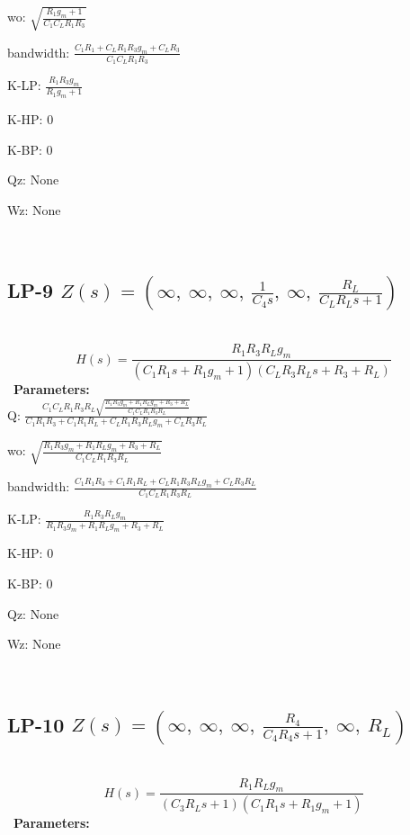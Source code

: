 \documentclass{article}
\begin{document}
wo: $\sqrt{\frac{R_{1} g_{m} + 1}{C_{1} C_{L} R_{1} R_{3}}}$\ 

bandwidth: $\frac{C_{1} R_{1} + C_{L} R_{1} R_{3} g_{m} + C_{L} R_{3}}{C_{1} C_{L} R_{1} R_{3}}$\ 

K-LP: $\frac{R_{1} R_{3} g_{m}}{R_{1} g_{m} + 1}$\ 

K-HP: $0$\ 

K-BP: $0$\ 

Qz: $\text{None}$\ 

Wz: $\text{None}$\ 

\ 

\subsection{LP-9 $Z(s) = \left( \infty, \  \infty, \  \infty, \  \frac{1}{C_{4} s}, \  \infty, \  \frac{R_{L}}{C_{L} R_{L} s + 1}\right)$ } \ 
\textbf{\[H(s) = \frac{R_{1} R_{3} R_{L} g_{m}}{\left(C_{1} R_{1} s + R_{1} g_{m} + 1\right) \left(C_{L} R_{3} R_{L} s + R_{3} + R_{L}\right)}\] } \ 
\textbf{Parameters:}\\ 

Q: $\frac{C_{1} C_{L} R_{1} R_{3} R_{L} \sqrt{\frac{R_{1} R_{3} g_{m} + R_{1} R_{L} g_{m} + R_{3} + R_{L}}{C_{1} C_{L} R_{1} R_{3} R_{L}}}}{C_{1} R_{1} R_{3} + C_{1} R_{1} R_{L} + C_{L} R_{1} R_{3} R_{L} g_{m} + C_{L} R_{3} R_{L}}$\ 

wo: $\sqrt{\frac{R_{1} R_{3} g_{m} + R_{1} R_{L} g_{m} + R_{3} + R_{L}}{C_{1} C_{L} R_{1} R_{3} R_{L}}}$\ 

bandwidth: $\frac{C_{1} R_{1} R_{3} + C_{1} R_{1} R_{L} + C_{L} R_{1} R_{3} R_{L} g_{m} + C_{L} R_{3} R_{L}}{C_{1} C_{L} R_{1} R_{3} R_{L}}$\ 

K-LP: $\frac{R_{1} R_{3} R_{L} g_{m}}{R_{1} R_{3} g_{m} + R_{1} R_{L} g_{m} + R_{3} + R_{L}}$\ 

K-HP: $0$\ 

K-BP: $0$\ 

Qz: $\text{None}$\ 

Wz: $\text{None}$\ 

\ 

\subsection{LP-10 $Z(s) = \left( \infty, \  \infty, \  \infty, \  \frac{R_{4}}{C_{4} R_{4} s + 1}, \  \infty, \  R_{L}\right)$ } \ 
\textbf{\[H(s) = \frac{R_{1} R_{L} g_{m}}{\left(C_{3} R_{L} s + 1\right) \left(C_{1} R_{1} s + R_{1} g_{m} + 1\right)}\] } \ 
\textbf{Parameters:}\\ 
\end{document}
